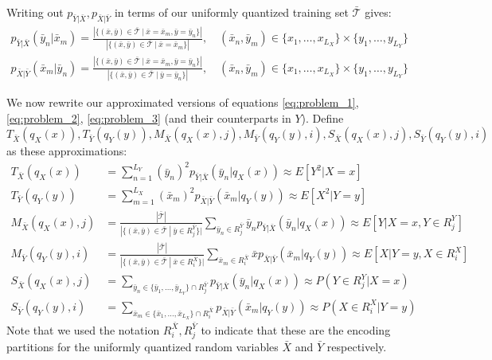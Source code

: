 Writing out $p_{\bar Y|\bar X}, p_{\bar X|\bar Y}$ in terms of our uniformly quantized training set $\mathcal{\bar T}$ gives:
\begin{align}
    p_{\bar Y|\bar X}(\bar y_n | \bar x_m)=\frac{
            \left|\{(\bar x,\bar y)\in \mathcal{\bar T}\ |\ \bar x = \bar x_m, \bar y = \bar y_n\}\right|
        }{
            \left|\{(\bar x,\bar y)\in \mathcal{\bar T}\ |\ \bar x = \bar x_m\}\right|
        },\quad (\bar x_n, \bar y_m)\in \{x_1,\ldots,x_{L_X}\}\times\{y_1,\ldots,y_{L_Y}\}\\
    p_{\bar X|\bar Y}(\bar x_m | \bar y_n)=\frac{
            \left|\{(\bar x,\bar y)\in \mathcal{\bar T}\ |\ \bar x = \bar x_m, \bar y = \bar y_n\}\right|
        }{
            \left|\{(\bar x,\bar y)\in \mathcal{\bar T}\ |\ \bar y = \bar y_n\}\right|
        },\quad (\bar x_n, \bar y_m)\in \{x_1,\ldots,x_{L_X}\}\times\{y_1,\ldots,y_{L_Y}\}
\end{align}

We now rewrite our approximated versions of equations \eqref{eq:problem_1}, \eqref{eq:problem_2}, \eqref{eq:problem_3} (and their counterparts in $Y$). Define $T_{\bar X}(q_X(x)),T_{\bar Y}(q_Y(y)),M_{\bar X}(q_X(x),j),M_{\bar Y}(q_Y(y),i),S_{\bar X}(q_X(x),j),S_{\bar Y}(q_Y(y),i)$ as these approximations:
\begin{align*}
    T_{\bar X}(q_X(x)) &= \sum_{n=1}^{L_Y}(\bar y_n)^2p_{\bar Y|\bar X}(\bar y_n|q_X(x)) \approx E[Y^2 | X = x]\\
    T_{\bar Y}(q_Y(y)) &= \sum_{m=1}^{L_X}(\bar x_m)^2p_{\bar X|\bar Y}(\bar x_m|q_Y(y)) \approx E[X^2 | Y = y]\\
    M_{\bar X}(q_X(x),j) &= 
        \frac{
            |\mathcal{\bar T}|
        }{
            |\{(\bar x, \bar y)\in \mathcal{\bar T}\ |\ \bar y\in R_j^{\bar Y}\}|
        } \sum_{\bar y_n\in R_j^{\bar Y}}\bar y_np_{\bar Y|\bar X}(\bar y_n|q_X(x))
        \approx E[Y|X=x,Y\in R_j^{Y}]\\
    M_{\bar Y}(q_Y(y),i) &= 
        \frac{
            |\mathcal{\bar T}|
        }{
            |\{(\bar x,\bar y)\in \mathcal{\bar T}\ |\ \bar x\in R_i^{\bar X}\}|
        } \sum_{\bar x_m\in R_i^{\bar X}}\bar xp_{\bar X|\bar Y}(\bar x_m|q_Y(y))
        \approx E[X|Y=y,X\in R_i^{X}]\\
    S_{\bar X}(q_X(x),j) &= 
        \sum_{\bar y_n\in \{\bar y_1,\ldots,\bar y_{L_Y}\}\cap R_j^{\bar Y}}p_{\bar Y|\bar X}(\bar y_n|q_X(x)) 
        \approx P(Y\in R_j^{Y}|X=x)\\
    S_{\bar Y}(q_Y(y),i) &= 
        \sum_{\bar x_m\in \{\bar x_1,\ldots,\bar x_{L_X}\}\cap R_i^{\bar X}}p_{\bar X|\bar Y}(\bar x_m|q_Y(y)) 
        \approx P(X\in R_i^{X}|Y=y)
\end{align*}
Note that we used the notation $R_i^{\bar X}, R_j^{\bar Y}$ to indicate that these are the encoding partitions for the uniformly quantized random variables $\bar X$ and $\bar Y$ respectively.

